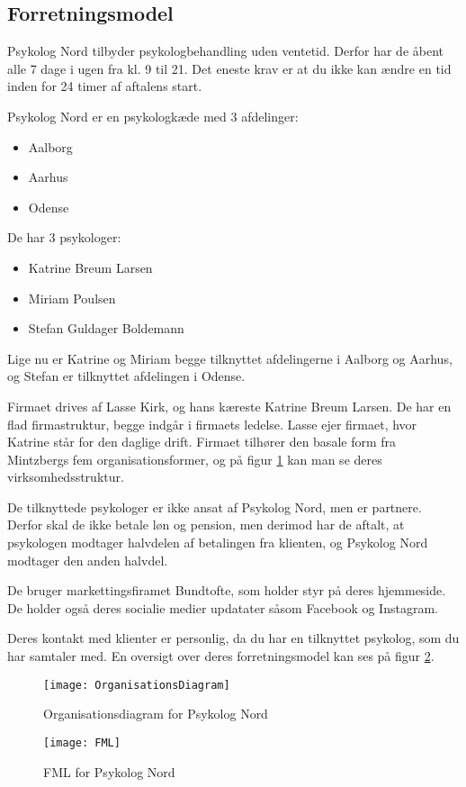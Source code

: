 \subsection{Forretningsmodel}
\label{section:forretningsmodel}

Psykolog Nord tilbyder psykologbehandling uden ventetid.
Derfor har de åbent alle 7 dage i ugen fra kl. 9 til 21. Det eneste krav er at du ikke kan ændre en tid inden for 24 timer af aftalens start.

Psykolog Nord er en psykologkæde med 3 afdelinger:
\begin{itemize}
    \item Aalborg
    \item Aarhus
    \item Odense
\end{itemize}

De har 3 psykologer:

\begin{itemize}
    \item Katrine Breum Larsen
    \item Miriam Poulsen
    \item Stefan Guldager Boldemann
\end{itemize}

Lige nu er Katrine og Miriam begge tilknyttet afdelingerne i Aalborg og Aarhus, og Stefan er tilknyttet afdelingen i Odense.


Firmaet drives af Lasse Kirk, og hans kæreste Katrine Breum Larsen.
De har en flad firmastruktur, begge indgår i firmaets ledelse. Lasse ejer firmaet, hvor Katrine står for den daglige drift. 
Firmaet tilhører den basale form fra Mintzbergs fem organisationsformer, og på 
figur \ref{forretning:organisationsdiagram} kan man se deres virksomhedsstruktur.

De tilknyttede psykologer er ikke ansat af Psykolog Nord, men er partnere.
Derfor skal de ikke betale løn og pension, men derimod har de aftalt, at psykologen modtager halvdelen af betalingen fra klienten, og Psykolog Nord modtager den anden halvdel.

De bruger markettingsfiramet Bundtofte, som holder styr på deres hjemmeside. De holder også deres socialie medier updatater såsom Facebook og Instagram.

Deres kontakt med klienter er personlig, da du har en tilknyttet psykolog, som 
du har samtaler med. En oversigt over deres forretningsmodel kan ses på figur \ref{forretning:fml}.

\begin{figure}[t]
    \caption{Organisationsdiagram for Psykolog Nord}
    \centering
        \texttt{[image: OrganisationsDiagram]}
    \label{forretning:organisationsdiagram}
\end{figure}

\begin{figure}[b]
    \caption{FML for Psykolog Nord}
    \centering
        \texttt{[image: FML]}
    \label{forretning:fml}
\end{figure}

